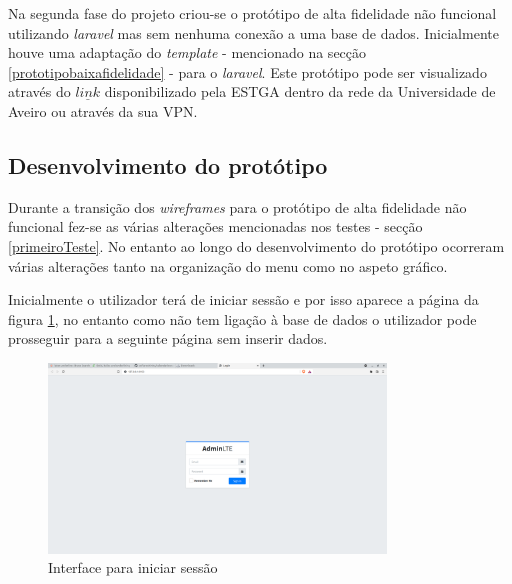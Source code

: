 \documentclass[11pt, twoside]{report}
\begin{document}
	Na segunda fase do projeto criou-se o protótipo de alta fidelidade não funcional utilizando \textit{laravel} mas sem nenhuma conexão a uma base de dados. Inicialmente houve uma adaptação do \textit{template} - mencionado na secção \ref{prototipobaixafidelidade} - para o \textit{laravel}.
	Este protótipo pode ser visualizado através do \href{http://estga-dev.clients.ua.pt/~ptdw-2021-gr4}{$\underline{link}$}  disponibilizado pela ESTGA dentro da rede da Universidade de Aveiro ou através da sua VPN.
	
	\subsection{Desenvolvimento do protótipo}

	Durante a transição dos \textit{wireframes} para o protótipo de alta fidelidade não funcional fez-se as várias alterações mencionadas nos testes - secção \ref{primeiroTeste}. No entanto ao longo do desenvolvimento do protótipo ocorreram várias alterações tanto na organização do menu como no aspeto gráfico.
	
	Inicialmente o utilizador terá de iniciar sessão e por isso aparece a página da figura \ref{login}, no entanto como não tem ligação à base de dados o utilizador pode prosseguir para a seguinte página sem inserir dados. 
	
	\begin{figure}[H] 
		\centering 							\includegraphics[width=0.8\textwidth,height=0.8\textheight,keepaspectratio]{image/PrototipoAFNF/login}
		\caption{Interface para iniciar sessão}
		\label{login}
	\end{figure}
	
\end{document}
